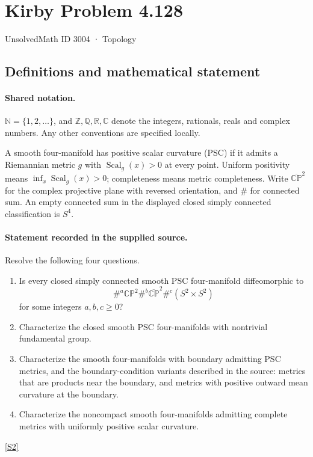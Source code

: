\documentclass[11pt]{article}
\newcommand{\sref}[2]{\hyperlink{source:#1:#2}{[S#2]}}
\begin{document}
\setcounter{section}{3003}
\section{Kirby Problem 4.128}\label{3004}
{\small\sffamily UnsolvedMath ID 3004 · Topology}
\subsection{Definitions and mathematical statement}

\paragraph{Shared notation.}$\mathbb N=\{1,2,\ldots\}$, and $\mathbb Z,\mathbb Q,\mathbb R,\mathbb C$ denote the integers, rationals, reals and complex numbers. Any other conventions are specified locally.


A smooth four-manifold has positive scalar curvature (PSC) if it admits a Riemannian metric $g$ with $\operatorname{Scal}_g(x)>0$ at every point. Uniform positivity means $\inf_x\operatorname{Scal}_g(x)>0$; completeness means metric completeness. Write $\overline{\mathbb{CP}}^{2}$ for the complex projective plane with reversed orientation, and $\#$ for connected sum. An empty connected sum in the displayed closed simply connected classification is $S^4$.
\paragraph{Statement recorded in the supplied source.}
Resolve the following four questions.
\begin{enumerate}
\item[(a)] Is every closed simply connected smooth PSC four-manifold diffeomorphic to
\[\#^{a}\mathbb{CP}^2\#^{b}\overline{\mathbb{CP}}^{2}\#^{c}(S^2\times S^2)\] for some integers $a,b,c\geq0$?
\item[(b)] Characterize the closed smooth PSC four-manifolds with nontrivial fundamental group.
\item[(c)] Characterize the smooth four-manifolds with boundary admitting PSC metrics, and the boundary-condition variants described in the source: metrics that are products near the boundary, and metrics with positive outward mean curvature at the boundary.
\item[(d)] Characterize the noncompact smooth four-manifolds admitting complete metrics with uniformly positive scalar curvature.
\end{enumerate} \sref{3004}{2}
\end{document}
